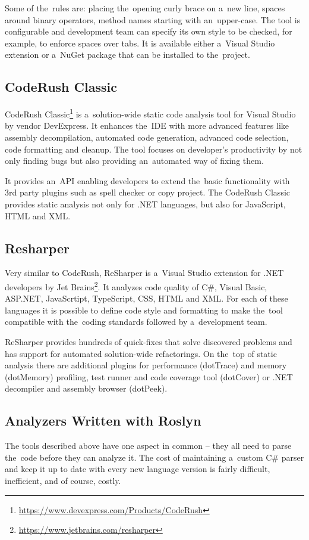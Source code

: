\documentclass[
  digital, %
  table,   %
  lof,     %
  lot,     %
  oneside,
]{fithesis3}
\begin{document}
Some of the~rules are: placing the~opening curly brace on a~new line, spaces around binary operators, method names starting with an~upper-case. The tool is configurable and development team can specify its own style to be checked, for example, to enforce spaces over tabs. It is available either a~Visual Studio extension or a~NuGet package that can be installed to the~project.

\subsection{CodeRush Classic}
CodeRush Classic\footnote{\url{https://www.devexpress.com/Products/CodeRush}} is a~solution-wide static code analysis tool for Visual Studio by vendor DevExpress. It enhances the~IDE with more advanced features like assembly decompilation, automated code generation, advanced code selection, code formatting and cleanup. The tool focuses on developer's productivity by not only finding bugs but also providing an~automated way of fixing them.

It provides an~API enabling developers to extend the~basic functionality with 3rd party plugins such as spell checker or copy project. The CodeRush Classic provides static analysis not only for .NET languages, but also for JavaScript, HTML and XML.

\subsection{Resharper}
Very similar to CodeRush, ReSharper is a~Visual Studio extension for .NET developers by Jet Brains\footnote{\url{https://www.jetbrains.com/resharper}}. It analyzes code quality of C\#, Visual Basic, ASP.NET, JavaScrtipt, TypeScript, CSS, HTML and XML. For each of these languages it is possible to define code style and formatting to make the~tool compatible with the~coding standards followed by a~development team. 

ReSharper provides hundreds of quick-fixes that solve discovered problems and has support for automated solution-wide refactorings. On the~top of static analysis there are additional plugins for performance (dotTrace) and memory (dotMemory) profiling, test runner and code coverage tool (dotCover) or .NET decompiler and assembly browser (dotPeek).


\subsection{Analyzers Written with Roslyn}
The tools described above have one aspect in common -- they all need to parse the~code before they can analyze it. The cost of maintaining a~custom C\# parser and keep it up to date with every new language version is fairly difficult, inefficient, and of course, costly. 
\end{document}
